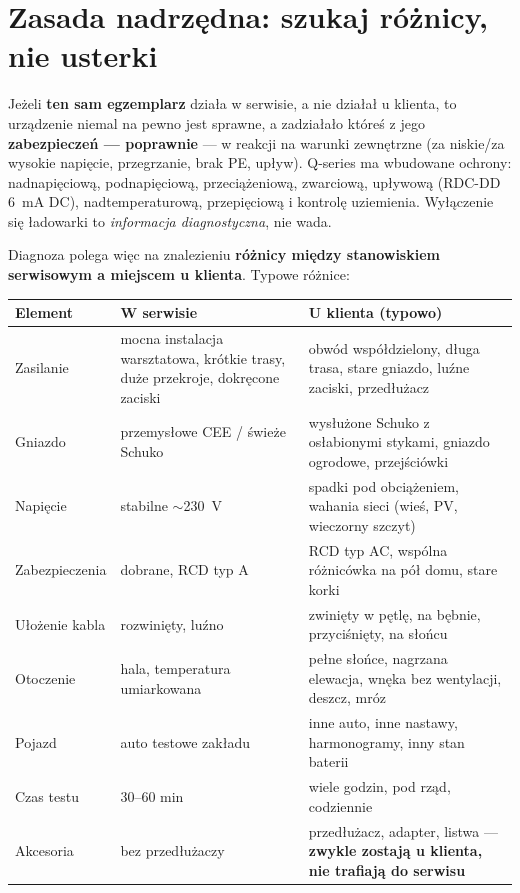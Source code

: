 \documentclass[11pt]{article}
\newcommand{\key}[1]{\textbf{\color{navy}#1}}
\newcommand{\warn}[1]{\textbf{\color{warnred}#1}}
\begin{document}
\section{Zasada nadrzędna: szukaj różnicy, nie usterki}\label{sec:zasada}
Jeżeli \key{ten sam egzemplarz} działa w serwisie, a nie działał u klienta, to urządzenie niemal na pewno jest sprawne, a zadziałało któreś z jego \key{zabezpieczeń — poprawnie} — w reakcji na warunki zewnętrzne (za niskie/za wysokie napięcie, przegrzanie, brak PE, upływ). Q-series ma wbudowane ochrony: nadnapięciową, podnapięciową, przeciążeniową, zwarciową, upływową (RDC-DD 6~mA DC), nadtemperaturową, przepięciową i kontrolę uziemienia. Wyłączenie się ładowarki to \emph{informacja diagnostyczna}, nie wada.

Diagnoza polega więc na znalezieniu \key{różnicy między stanowiskiem serwisowym a miejscem u klienta}. Typowe różnice:

\begin{tabularx}{\textwidth}{@{}p{3.4cm}YY@{}}
\toprule
\textbf{\sffamily Element} & \textbf{\sffamily W serwisie} & \textbf{\sffamily U klienta (typowo)}\\
\midrule
Zasilanie & mocna instalacja warsztatowa, krótkie trasy, duże przekroje, dokręcone zaciski & obwód współdzielony, długa trasa, stare gniazdo, luźne zaciski, przedłużacz\\
Gniazdo & przemysłowe CEE / świeże Schuko & wysłużone Schuko z osłabionymi stykami, gniazdo ogrodowe, przejściówki\\
Napięcie & stabilne $\sim$230~V & spadki pod obciążeniem, wahania sieci (wieś, PV, wieczorny szczyt)\\
Zabezpieczenia & dobrane, RCD typ A & RCD typ AC, wspólna różnicówka na pół domu, stare korki\\
Ułożenie kabla & rozwinięty, luźno & zwinięty w pętlę, na bębnie, przyciśnięty, na słońcu\\
Otoczenie & hala, temperatura umiarkowana & pełne słońce, nagrzana elewacja, wnęka bez wentylacji, deszcz, mróz\\
Pojazd & auto testowe zakładu & inne auto, inne nastawy, harmonogramy, inny stan baterii\\
Czas testu & 30--60 min & wiele godzin, pod rząd, codziennie\\
Akcesoria & bez przedłużaczy & przedłużacz, adapter, listwa — \warn{zwykle zostają u klienta, nie trafiają do serwisu}\\
\bottomrule
\end{tabularx}
\end{document}
